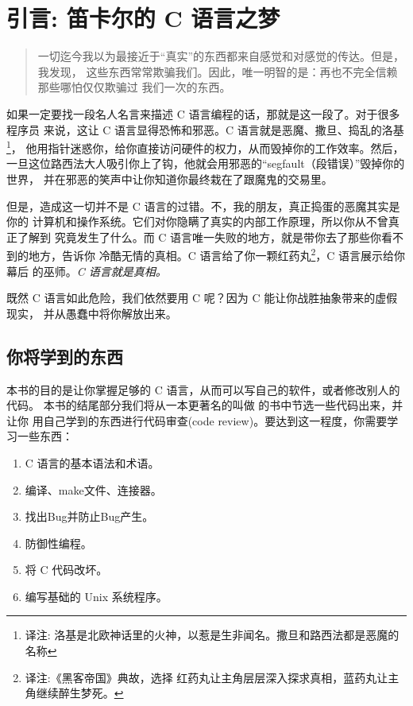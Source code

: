 \chapter*{引言: 笛卡尔的 C 语言之梦}

\begin{quotation}

一切迄今我以为最接近于“真实”的东西都来自感觉和对感觉的传达。但是，我发现，
这些东西常常欺骗我们。因此，唯一明智的是：再也不完全信赖那些哪怕仅仅欺骗过
我们一次的东西。

\end{quotation}

如果一定要找一段名人名言来描述 C 语言编程的话，那就是这一段了。对于很多程序员
来说，这让 C 语言显得恐怖和邪恶。C 语言就是恶魔、撒旦、捣乱的洛基\footnote
{译注: 洛基是北欧神话里的火神，以惹是生非闻名。撒旦和路西法都是恶魔的名称}，
他用指针迷惑你，给你直接访问硬件的权力，从而毁掉你的工作效率。然后，
一旦这位路西法大人吸引你上了钩，他就会用邪恶的“segfault（段错误）”毁掉你的世界，
并在邪恶的笑声中让你知道你最终栽在了跟魔鬼的交易里。

但是，造成这一切并不是 C 语言的过错。不，我的朋友，真正捣蛋的恶魔其实是你的
计算机和操作系统。它们对你隐瞒了真实的内部工作原理，所以你从不曾真正了解到
究竟发生了什么。而 C 语言唯一失败的地方，就是带你去了那些你看不到的地方，告诉你
冷酷无情的真相。C 语言给了你一颗红药丸\footnote{译注:《黑客帝国》典故，选择
红药丸让主角层层深入探求真相，蓝药丸让主角继续醉生梦死。}，C 语言展示给你幕后
的巫师。\emph{C 语言就是真相。}

既然 C 语言如此危险，我们依然要用 C 呢？因为 C 能让你战胜抽象带来的虚假现实，
并从愚蠢中将你解放出来。

\section*{你将学到的东西}

本书的目的是让你掌握足够的 C 语言，从而可以写自己的软件，或者修改别人的代码。
本书的结尾部分我们将从一本更著名的叫做 \krc 的书中节选一些代码出来，并让你
用自己学到的东西进行代码审查(code review)。要达到这一程度，你需要学习一些东西：

\begin{enumerate}
\item C 语言的基本语法和术语。
\item 编译、make文件、连接器。
\item 找出Bug并防止Bug产生。
\item 防御性编程。
\item 将 C 代码改坏。
\item 编写基础的 Unix 系统程序。
\end{enumerate}

